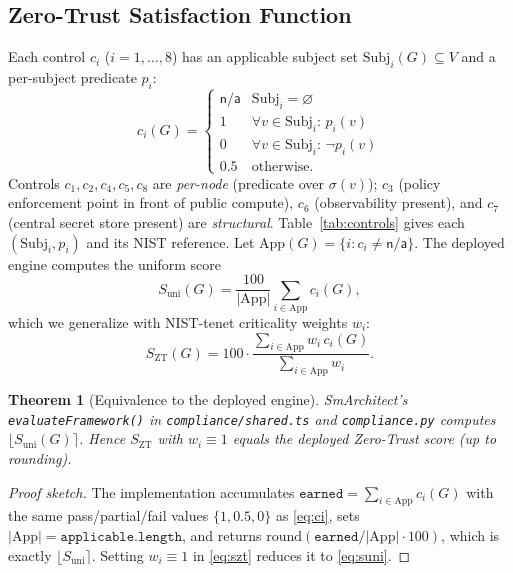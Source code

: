 \documentclass[journal]{IEEEtran}
\theoremstyle{plain}
\newtheorem{theorem}{Theorem}
\theoremstyle{definition}
\newcommand{\G}{G}
\newcommand{\Szt}{S_{\mathrm{ZT}}}
\newcommand{\App}{\mathrm{App}}
\newcommand{\Subj}{\mathrm{Subj}}
\newcommand{\code}[1]{\texttt{\small #1}}
\begin{document}
\subsection{Zero-Trust Satisfaction Function}
Each control $c_i$ ($i=1,\ldots,8$) has an applicable subject set
$\Subj_i(\G)\subseteq V$ and a per-subject predicate $p_i$:
\begin{equation}
c_i(\G)=\begin{cases}
\textsf{n/a} & \Subj_i=\varnothing\\
1 & \forall v\in\Subj_i:\,p_i(v)\\
0 & \forall v\in\Subj_i:\,\neg p_i(v)\\
0.5 & \text{otherwise.}
\end{cases}
\label{eq:ci}
\end{equation}
Controls $c_1,c_2,c_4,c_5,c_8$ are \emph{per-node} (predicate over $\sigma(v)$);
$c_3$ (policy enforcement point in front of public compute), $c_6$
(observability present), and $c_7$ (central secret store present) are
\emph{structural}. Table~\ref{tab:controls} gives each $(\Subj_i,p_i)$ and its
NIST reference. Let $\App(\G)=\{i:c_i\neq\textsf{n/a}\}$. The deployed engine
computes the uniform score
\begin{equation}
S_{\text{uni}}(\G)=\frac{100}{|\App|}\sum_{i\in\App}c_i(\G),
\label{eq:suni}
\end{equation}
which we generalize with NIST-tenet criticality weights $w_i$:
\begin{equation}
\Szt(\G)=100\cdot\frac{\sum_{i\in\App}w_i\,c_i(\G)}{\sum_{i\in\App}w_i}.
\label{eq:szt}
\end{equation}

\begin{theorem}[Equivalence to the deployed engine]\label{thm:equiv}
SmArchitect's \code{evaluateFramework()} in \code{compliance/shared.ts} and
\code{compliance.py} computes $\big\lfloor S_{\text{uni}}(\G)\big\rceil$. Hence
$\Szt$ with $w_i\equiv 1$ equals the deployed Zero-Trust score (up to rounding).
\end{theorem}
\begin{proof}[Proof sketch]
The implementation accumulates
$\texttt{earned}=\sum_{i\in\App}c_i(\G)$ with the same pass/partial/fail values
$\{1,0.5,0\}$ as \eqref{eq:ci}, sets $|\App|=\texttt{applicable.length}$, and
returns $\mathrm{round}(\texttt{earned}/|\App|\cdot100)$, which is exactly
$\lfloor S_{\text{uni}}\rceil$. Setting $w_i\equiv1$ in \eqref{eq:szt} reduces it
to \eqref{eq:suni}.
\end{proof}
\end{document}
